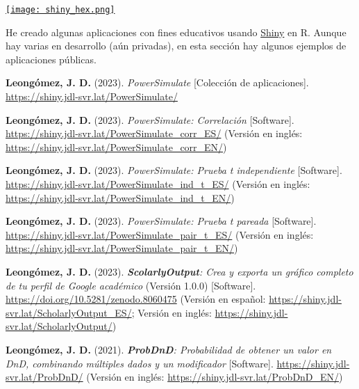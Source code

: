 \documentclass[11pt,a4paper,]{awesome-cv}
\begin{document}
\endgroup

\begin{minipage}[c]{0.10\linewidth}
\href{https://jdleongomez.info/es/#shiny}{\texttt{[image: shiny\_hex.png]}}
\end{minipage} \begin{minipage}[c]{0.90\linewidth} \begin{footnotesize}
He creado algunas aplicaciones con fines educativos usando \href{https://shiny.posit.co/}{Shiny} en R. Aunque hay varias en desarrollo (aún privadas), en esta sección hay algunos ejemplos de aplicaciones públicas.
\end{footnotesize}
\end{minipage}

\begingroup
\footnotesize
\setlength{\parindent}{-0.5in}
\setlength{\leftskip}{0.5in}

\textbf{Leongómez, J. D.} (2023). \emph{PowerSimulate} {[}Colección de
aplicaciones{]}. \url{https://shiny.jdl-svr.lat/PowerSimulate/}

\textbf{Leongómez, J. D.} (2023). \emph{PowerSimulate: Correlación}
{[}Software{]}. \url{https://shiny.jdl-svr.lat/PowerSimulate_corr_ES/}
(Versión en inglés:
\url{https://shiny.jdl-svr.lat/PowerSimulate_corr_EN/})

\textbf{Leongómez, J. D.} (2023). \emph{PowerSimulate: Prueba t
independiente} {[}Software{]}.
\url{https://shiny.jdl-svr.lat/PowerSimulate_ind_t_ES/} (Versión en
inglés: \url{https://shiny.jdl-svr.lat/PowerSimulate_ind_t_EN/})

\textbf{Leongómez, J. D.} (2023). \emph{PowerSimulate: Prueba t pareada}
{[}Software{]}. \url{https://shiny.jdl-svr.lat/PowerSimulate_pair_t_ES/}
(Versión en inglés:
\url{https://shiny.jdl-svr.lat/PowerSimulate_pair_t_EN/})

\textbf{Leongómez, J. D.} (2023). \emph{\textbf{ScolarlyOutput}: Crea y
exporta un gráfico completo de tu perfil de Google académico} (Versión
1.0.0) {[}Software{]}.
\href{https://shiny.jdl-svr.lat/ScholarlyOutput/}{https://doi.org/10.5281/zenodo.8060475}
(Versión en español:
\url{https://shiny.jdl-svr.lat/ScholarlyOutput_ES/}; Versión en inglés:
\url{https://shiny.jdl-svr.lat/ScholarlyOutput/})

\textbf{Leongómez, J. D.} (2021). \emph{\textbf{ProbDnD}: Probabilidad
de obtener un valor en DnD, combinando múltiples dados y un modificador}
{[}Software{]}. \url{https://shiny.jdl-svr.lat/ProbDnD/} (Versión en
inglés: \url{https://shiny.jdl-svr.lat/ProbDnD_EN/})
\end{document}
